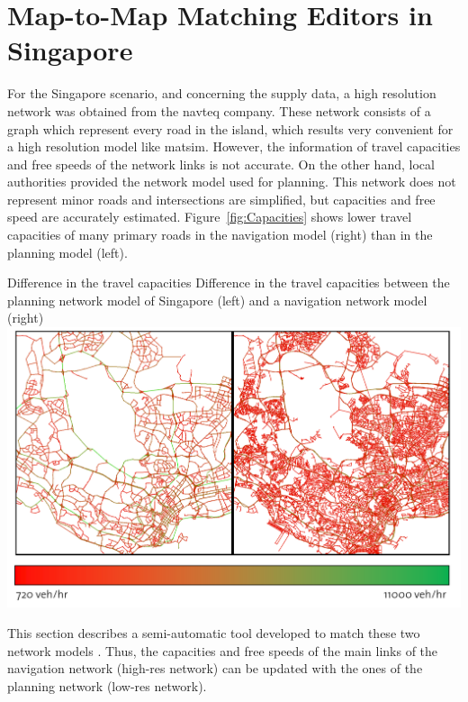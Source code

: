 \section{Map-to-Map Matching Editors in Singapore}
\label{sec:networkeditor-singapore}
For the Singapore scenario, and concerning the supply data, a high resolution network was obtained from the \gls{navteq} company. These network consists of a graph which represent every road in the island, which results very convenient for a high resolution model like \gls{matsim}. However, the information of travel capacities and free speeds of the network links is not accurate. On the other hand, local authorities provided the network model used for planning. This network does not represent minor roads and intersections are simplified, but capacities and free speed are accurately estimated. Figure~\ref{fig:Capacities} shows lower travel capacities of many primary roads in the navigation model (right) than in the planning model (left).

\createfigure
{Difference in the travel capacities}
{Difference in the travel capacities between the planning network model of Singapore (left) and a navigation network model (right)}
{\label{fig:Capacities}}
{\includegraphics[width=1.0\textwidth]{extending/figures/netEdSing/Capacities.png}}
{}

This section describes a semi-automatic tool developed to match these two network models \citep[][]{Ordonez_Webpage_2011_3}. Thus, the capacities and free speeds of the main links of the navigation network (high-res network) can be updated with the ones of the planning network (low-res network).

